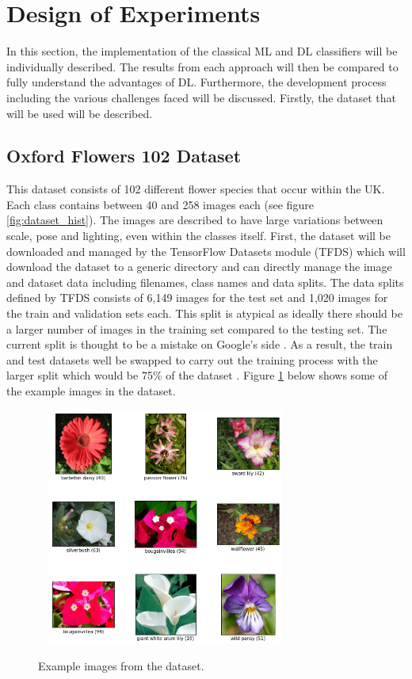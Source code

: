 \documentclass[12pt,a4paper]{report}
\begin{document}
\section{Design of Experiments}

In this section, the implementation of the classical ML and DL classifiers will be individually described. The results 
from each
approach will then be compared to fully understand the advantages of DL. Furthermore, the development process
including the various challenges faced will be discussed. Firstly, the dataset that will be used will be described.

\subsection{Oxford Flowers 102 Dataset}

This dataset consists of 102 different flower species that occur within the UK. Each class contains between 40 and 258 
images each (see figure \ref{fig:dataset_hist}). The images are described to have large variations between scale, 
pose and lighting, even within the classes
itself. First, the dataset will be downloaded and managed by the TensorFlow Datasets module (TFDS) which will download 
the dataset to a generic directory and can directly manage the image and dataset data including filenames, class names 
and data splits. The data splits defined by TFDS consists of 6,149 images for the test set and 1,020 images for the 
train and validation sets each. This split is atypical as ideally there should be a larger number of images in the training 
set compared to the testing set. The current split is thought to be a mistake on Google's side \citep{githubissue}. As a 
result, the train and test datasets well be swapped to carry out the training process with the larger split which would be 
75\% of the dataset \citep{TFOX102}. Figure \ref{fig:ox102} below shows some of the example images in the dataset.

\begin{figure}[h]\
    \centering
    \includegraphics[width=0.7\textwidth]{ox102examples.png}
    \caption{Example images from the dataset.}
    \label{fig:ox102}
\end{figure}
\end{document}
